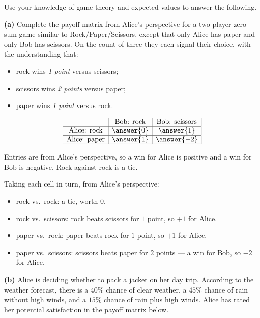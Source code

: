 \documentclass[12pt]{ximera}
\begin{document}
\begin{problem}
Use your knowledge of game theory and expected values to answer the following.

\begin{prompt}
\textbf{(a)} Complete the payoff matrix from Alice's perspective for a two-player
zero-sum game similar to Rock/Paper/Scissors, except that only Alice has paper and
only Bob has scissors. On the count of three they each signal their choice, with the
understanding that:
\begin{itemize}
\item rock wins \emph{1 point} versus scissors;
\item scissors wins \emph{2 points} versus paper;
\item paper wins \emph{1 point} versus rock.
\end{itemize}

\[
\begin{array}{c|c|c|}
\phantom{|} & \text{Bob: rock} & \text{Bob: scissors} \\\hline
\text{Alice: rock} & \answer{0} & \answer{1} \\\hline
\text{Alice: paper} & \answer{1} & \answer{-2} \\\hline
\end{array}
\]

\begin{hint}
Entries are from Alice's perspective, so a win for Alice is positive and a win for
Bob is negative. Rock against rock is a tie.
\end{hint}

\begin{feedback}
Taking each cell in turn, from Alice's perspective:
\begin{itemize}
\item rock vs.\ rock: a tie, worth $0$.
\item rock vs.\ scissors: rock beats scissors for $1$ point, so $+1$ for Alice.
\item paper vs.\ rock: paper beats rock for $1$ point, so $+1$ for Alice.
\item paper vs.\ scissors: scissors beats paper for $2$ points --- a win for Bob, so
      $-2$ for Alice.
\end{itemize}
\end{feedback}
\end{prompt}

\begin{prompt}
\textbf{(b)} Alice is deciding whether to pack a jacket on her day trip. According to
the weather forecast, there is a $40\%$ chance of clear weather, a $45\%$ chance of
rain without high winds, and a $15\%$ chance of rain plus high winds. Alice has rated
her potential satisfaction in the payoff matrix below.


\end{prompt}
\end{problem}
\end{document}
